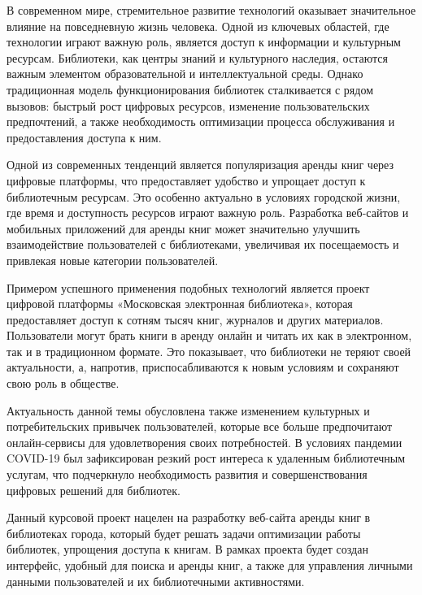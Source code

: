 \maketableofcontents

\intro

В современном мире, стремительное развитие технологий оказывает значительное влияние на повседневную жизнь человека. Одной из ключевых областей, где технологии играют важную роль, является доступ к информации и культурным ресурсам. Библиотеки, как центры знаний и культурного наследия, остаются важным элементом образовательной и интеллектуальной среды. Однако традиционная модель функционирования библиотек сталкивается с рядом вызовов: быстрый рост цифровых ресурсов, изменение пользовательских предпочтений, а также необходимость оптимизации процесса обслуживания и предоставления доступа к ним.

Одной из современных тенденций является популяризация аренды книг через цифровые платформы, что предоставляет удобство и упрощает доступ к библиотечным ресурсам. Это особенно актуально в условиях городской жизни, где время и доступность ресурсов играют важную роль. Разработка веб-сайтов и мобильных приложений для аренды книг может значительно улучшить взаимодействие пользователей с библиотеками, увеличивая их посещаемость и привлекая новые категории пользователей.

Примером успешного применения подобных технологий является проект цифровой платформы «Московская электронная библиотека», которая предоставляет доступ к сотням тысяч книг, журналов и других материалов. Пользователи могут брать книги в аренду онлайн и читать их как в электронном, так и в традиционном формате. Это показывает, что библиотеки не теряют своей актуальности, а, напротив, приспосабливаются к новым условиям и сохраняют свою роль в обществе.

Актуальность данной темы обусловлена также изменением культурных и потребительских привычек пользователей, которые все больше предпочитают онлайн-сервисы для удовлетворения своих потребностей. В условиях пандемии COVID-19 был зафиксирован резкий рост интереса к удаленным библиотечным услугам, что подчеркнуло необходимость развития и совершенствования цифровых решений для библиотек.

Данный курсовой проект нацелен на разработку веб-сайта аренды книг в библиотеках города, который будет решать задачи оптимизации работы библиотек, упрощения доступа к книгам. В рамках проекта будет создан интерфейс, удобный для поиска и аренды книг, а также для управления личными данными пользователей и их библиотечными активностями.